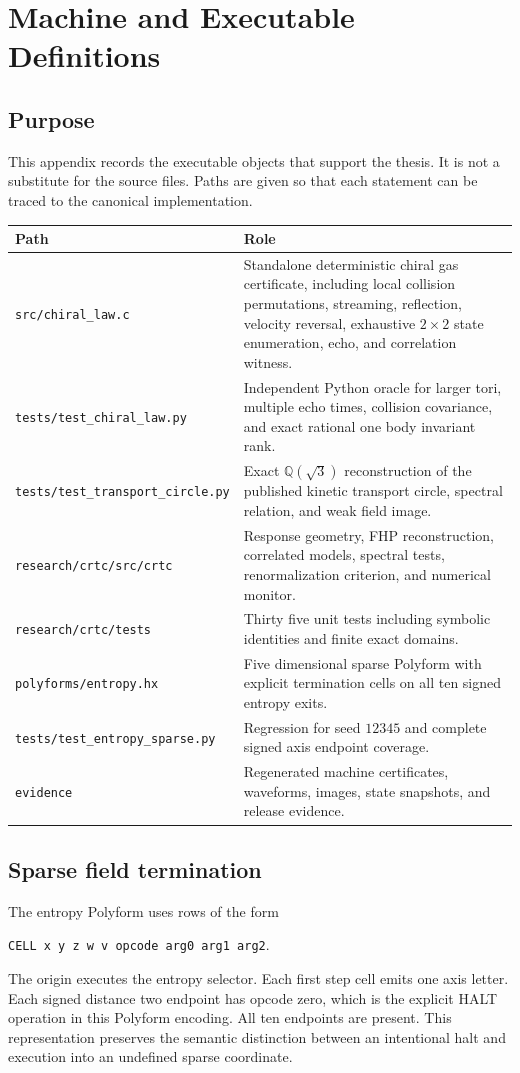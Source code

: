 \chapter{Machine and Executable Definitions}\label{app:machine}

\section{Purpose}
This appendix records the executable objects that support the thesis. It is not a substitute for the source files. Paths are given so that each statement can be traced to the canonical implementation.

\begin{longtable}{p{}p{}}
\toprule
Path & Role \\
\midrule
\endhead
\texttt{src/chiral\_law.c} & Standalone deterministic chiral gas certificate, including local collision permutations, streaming, reflection, velocity reversal, exhaustive $2\times2$ state enumeration, echo, and correlation witness.\\
\texttt{tests/test\_chiral\_law.py} & Independent Python oracle for larger tori, multiple echo times, collision covariance, and exact rational one body invariant rank.\\
\texttt{tests/test\_transport\_circle.py} & Exact $\mathbb{Q}(\sqrt3)$ reconstruction of the published kinetic transport circle, spectral relation, and weak field image.\\
\texttt{research/crtc/src/crtc} & Response geometry, FHP reconstruction, correlated models, spectral tests, renormalization criterion, and numerical monitor.\\
\texttt{research/crtc/tests} & Thirty five unit tests including symbolic identities and finite exact domains.\\
\texttt{polyforms/entropy.hx} & Five dimensional sparse Polyform with explicit termination cells on all ten signed entropy exits.\\
\texttt{tests/test\_entropy\_sparse.py} & Regression for seed $12345$ and complete signed axis endpoint coverage.\\
\texttt{evidence} & Regenerated machine certificates, waveforms, images, state snapshots, and release evidence.\\
\bottomrule
\end{longtable}

\section{Sparse field termination}
The entropy Polyform uses rows of the form
\begin{center}
\texttt{CELL x y z w v opcode arg0 arg1 arg2}.
\end{center}
The origin executes the entropy selector. Each first step cell emits one axis letter. Each signed distance two endpoint has opcode zero, which is the explicit HALT operation in this Polyform encoding. All ten endpoints are present. This representation preserves the semantic distinction between an intentional halt and execution into an undefined sparse coordinate.

